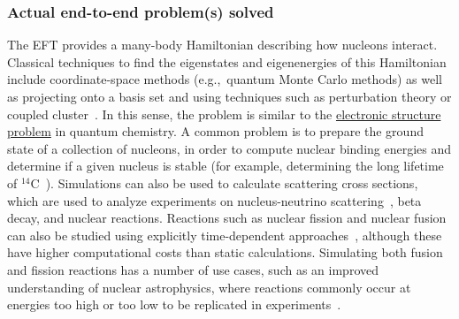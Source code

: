 \begin{refsection}
\subsubsection*{Actual end-to-end problem(s) solved}
The EFT provides a many-body Hamiltonian describing how nucleons interact. Classical techniques to find the eigenstates and eigenenergies of this Hamiltonian include coordinate-space methods (e.g.,~quantum Monte Carlo methods) as well as projecting onto a basis set and using techniques such as perturbation theory or coupled cluster~\cite{hergert2020AbInitioNuclear}. In this sense, the problem is similar to the \hyperref[appl:ElectronicStructure]{electronic structure problem} in quantum chemistry. A common problem is to prepare the ground state of a collection of nucleons, in order to compute nuclear binding energies and determine if a given nucleus is stable (for example, determining the long lifetime of $^{14}$C~\cite{maris2011Carbon14Lifetime, hagen2014CoupledClusterNuclear}). Simulations can also be used to calculate scattering cross sections, which are used to analyze experiments on nucleus-neutrino scattering~\cite{roggero2020NeutrinoNucleus}, beta decay, and nuclear reactions. Reactions such as nuclear fission and nuclear fusion can also be studied using explicitly time-dependent approaches~\cite{bender2020NuclearFission}, although these have higher computational costs than static calculations. Simulating both fusion and fission reactions has a number of use cases, such as an improved understanding of nuclear astrophysics, where reactions commonly occur at energies too high or too low to be replicated in experiments~\cite{navratil2022NuclearReaction}. 





\end{refsection}
